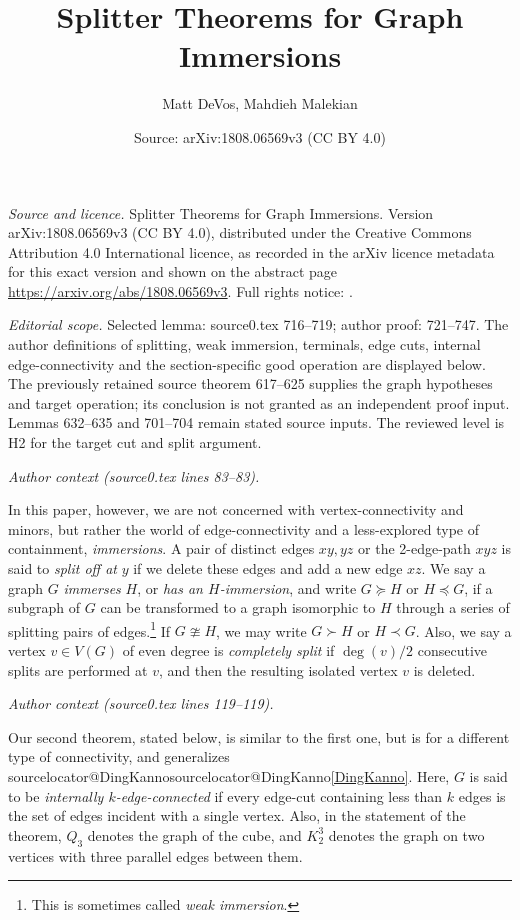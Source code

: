 \documentclass[10pt,a4paper]{amsart}
\title[Splitter Theorems for Graph Immersions]{Splitter Theorems for Graph Immersions}
\author{Matt DeVos, Mahdieh Malekian}
\date{Source: arXiv:1808.06569v3 (CC BY 4.0)}
\makeatletter
\let\originalcref\cref
\renewcommand{\cref}[1]{\ifcsname sourcelocator@#1\endcsname\csname sourcelocator@#1\endcsname\else\originalcref{#1}\fi}
\makeatother
\begin{document}
\maketitle

\noindent\emph{Source and licence.} Splitter Theorems for Graph Immersions. Version arXiv:1808.06569v3 (CC BY 4.0), distributed under the Creative Commons Attribution 4.0 International licence, as recorded in the arXiv licence metadata for this exact version and shown on the abstract page \url{https://arxiv.org/abs/1808.06569v3}. Full rights notice: .\par\smallskip

\noindent\textit{Editorial scope.} Selected lemma: source0.tex 716--719; author proof: 721--747. The author definitions of splitting, weak immersion, terminals, edge cuts, internal edge-connectivity and the section-specific good operation are displayed below. The previously retained source theorem 617--625 supplies the graph hypotheses and target operation; its conclusion is not granted as an independent proof input. Lemmas 632--635 and 701--704 remain stated source inputs. The reviewed level is H2 for the target cut and split argument.\par\smallskip
\par\medskip\noindent\textit{Author context (source0.tex lines 83--83).}\par\smallskip
In this paper, however, we are not concerned with vertex-connectivity and minors, but rather the world of edge-connectivity and a less-explored type of containment, \emph{immersions}. A pair of distinct edges $xy, yz$  or the 2-edge-path $xyz$ is said to \emph{split off at} $y$ if we delete these edges and add a new edge $xz$. We say a graph $G$ \emph{immerses} $H$, or \emph{has an $H$-immersion}, and write $G \succeq H$ or $H \preceq G$, if a subgraph of $G$ can be transformed to a graph isomorphic to $H$ through a series of splitting pairs of edges.\footnote{This is sometimes called \emph{weak immersion}.} If $G \ncong H$, we may write $G \succ H$ or $H \prec G$.  Also, we say a vertex $v \in V(G)$ of even degree is \emph{completely split} if $\deg(v)/2$ consecutive splits are performed at $v$, and then the resulting isolated vertex $v$ is deleted.
\par\medskip\noindent\textit{Author context (source0.tex lines 119--119).}\par\smallskip
Our second theorem, stated below, is similar to the first one, but is for a different type of connectivity, and generalizes \cref{DingKanno}. Here, $G$ is said to be \emph{internally $k$-edge-connected} if every edge-cut containing less than $k$ edges is the set of edges incident with a single vertex. Also, in the statement of the theorem, $Q_3$ denotes the graph of the cube, and $K_2^3$ denotes the graph on two vertices with three parallel edges between them.
\end{document}
